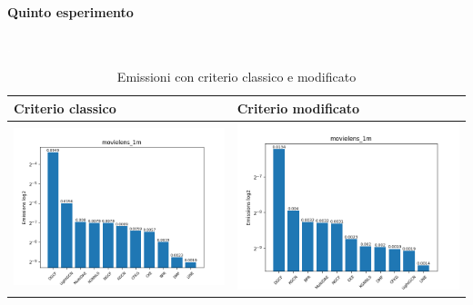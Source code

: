 \paragraph{Quinto esperimento} \textcolor{white}{.} \\ 
\begin{table}[H]
    \centering
    \footnotesize
    \setlength\tabcolsep{0pt}
    \begin{tabularx}{\textwidth}{|X|X|}
        \hline
        \textbf{Criterio classico} & \textbf{Criterio modificato} \\
        \hline
        \includegraphics[width=\linewidth, trim=0 0 0 0]{images/emissions_movielens_1m_40_7_earlyClassic.png} &
        \includegraphics[width=\linewidth, trim=0 0 0 0]{images/emissions_movielens_1m_40_7_earlyModified.png} \\
        \hline
    \end{tabularx}
    \caption{Emissioni con criterio classico e modificato}
    \label{tab:emissions_info}
\end{table}



